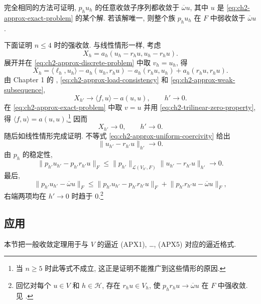 \begin{Proof}
完全相同的方法可证明, $p_hu_h$ 的任意收敛子序列都收敛于 $\overline\omega u$, 其中 $u$ 是 \eqref{eq:ch2-approx-exact-problem} 的某个解. 若该解唯一, 则整个族 $p_hu_h$ 在 $F$ 中弱收敛于 $\overline\omega u$.

下面证明 $n\leq4$ 时的强收敛. 与线性情形一样, 考虑
\[
X_h=a_h(u_h-r_hu,u_h-r_hu).
\]
展开并在 \eqref{eq:ch2-approx-discrete-problem} 中取 $v_h=u_h$, 得
\[
X_h=\langle\ell_h,u_h\rangle-a_h(u_h,r_hu)-a_h(r_hu,u_h)+a_h(r_hu,r_hu).
\]
由 Chapter 1 的 , \eqref{eq:ch2-approx-load-consistency} 和 \eqref{eq:ch2-approx-weak-subsequence},
\[
X_{h'}\longrightarrow\langle f,u\rangle-a(u,u),\qquad h'\to0.
\]
在 \eqref{eq:ch2-approx-exact-problem} 中取 $v=u$ 并用 \eqref{eq:ch2-trilinear-zero-property}, 得 $\langle f,u\rangle=a(u,u)$,\footnote{当 $n\geq5$ 时此等式不成立, 这正是证明不能推广到这些情形的原因.} 因而
\begin{equation}
X_{h'}\longrightarrow0,
\qquad h'\to0.
\label{eq:ch2-approx-energy-convergence}
\end{equation}
随后如线性情形完成证明. 不等式 \eqref{eq:ch2-approx-uniform-coercivity} 给出
\[
\lVert u_{h'}-r_{h'}u\rVert_{h'}\longrightarrow0.
\]
由 $p_h$ 的稳定性,
\[
\lVert p_{h'}u_{h'}-p_{h'}r_{h'}u\rVert_F
\leq\lVert p_{h'}\rVert_{\mathcal L(V_{h'},F)}
\lVert u_{h'}-r_{h'}u\rVert_{h'}\longrightarrow0.
\]
最后,
\[
\lVert p_{h'}u_{h'}-\overline\omega u\rVert_F
\leq\lVert p_{h'}u_{h'}-p_{h'}r_{h'}u\rVert_F
+\lVert p_{h'}r_{h'}u-\overline\omega u\rVert_F,
\]
右端两项均在 $h'\to0$ 时趋于 $0$.\footnote{回忆对每个 $u\in V$ 和 $h\in\mathcal H$, 存在 $r_hu\in V_h$, 使 $p_hr_hu\to\overline\omega u$ 在 $F$ 中强收敛. 见 .}
\end{Proof}

\hypertarget{chapter-02-page-153}{}
\subsection{应用}
\label{subsec:ch2-approx-applications}

本节把一般收敛定理用于与 $V$ 的逼近 (APX1), \ldots, (APX5) 对应的逼近格式.

